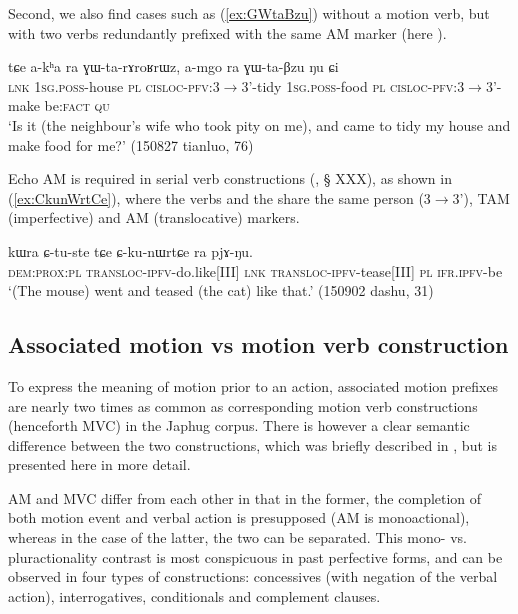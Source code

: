 Second, we also find cases such as (\ref{ex:GWtaBzu}) without a motion verb, but with two verbs redundantly prefixed with the same AM marker (here ).

\begin{exe}
\ex \label{ex:GWtaBzu}
\gll  tɕe a-kʰa ra ɣɯ-ta-rɤroʁrɯz, 	a-mgo  ra ɣɯ-ta-βzu ŋu ɕi \\
\textsc{lnk} \textsc{1sg}.\textsc{poss}-house \textsc{pl} \textsc{cisloc}-\textsc{pfv}:3$\rightarrow$3'-tidy 
 \textsc{1sg}.\textsc{poss}-food \textsc{pl} \textsc{cisloc}-\textsc{pfv}:3$\rightarrow$3'-make be:\textsc{fact} \textsc{qu} \\ 
\glt `Is it (the neighbour's wife who took pity on me), and came to tidy my house and make food for me?'  (150827 tianluo, 76)
\end{exe}


Echo AM is required in serial verb constructions (\citealt[253-255]{jacques16complementation}, § XXX), as shown in (\ref{ex:CkunWrtCe}), where the verbs  and the  share the same person (3$\rightarrow$3'), TAM (imperfective) and AM (translocative) markers.

\begin{exe}
\ex \label{ex:CkunWrtCe}
\gll  kɯra ɕ-tu-ste tɕe ɕ-ku-nɯrtɕe ra pjɤ-ŋu. \\
\textsc{dem}:\textsc{prox}:\textsc{pl} \textsc{transloc}-\textsc{ipfv}-do.like[III] \textsc{lnk}  \textsc{transloc}-\textsc{ipfv}-tease[III] \textsc{pl} \textsc{ifr}.\textsc{ipfv}-be \\
\glt `(The mouse) went and teased (the cat) like that.' (150902 dashu, 31)
\end{exe}

\subsection{Associated motion vs motion verb construction}
To express the meaning of motion prior to an action, associated motion prefixes are nearly two times as common as corresponding motion verb constructions (henceforth MVC) in the Japhug corpus. There is however a clear semantic difference between the two constructions, which was briefly described in \citet{jacques13harmonization}, but is presented here in more detail.

AM and MVC differ from each other in that in the former, the completion of both motion event and verbal action is presupposed (AM is monoactional), whereas in the case of the latter, the two can be separated. This mono- vs. pluractionality contrast is most conspicuous in past perfective forms, and can be observed in four types of constructions: concessives (with negation of the verbal action), interrogatives, conditionals and complement clauses.

